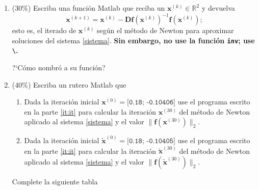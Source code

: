 \documentclass[letter,11pt]{article}
\newcommand{\matlab}{{\sc Matlab} }
\begin{document}
\begin{enumerate}
\begin{enumerate}
\item\label{it:it} (30\%) Escriba una funci\'on \matlab que reciba un $\boldsymbol{x}^{(k)} \in \mathbb{R}^2$ y devuelva
%
\begin{equation*}
\boldsymbol{x}^{(k+1)} = \boldsymbol{x}^{(k)} - \boldsymbol{D}\boldsymbol{f}(\boldsymbol{x}^{(k)})^{-1} \boldsymbol{f}(\boldsymbol{x}^{(k)});
\end{equation*}
%
esto es, el iterado de $\boldsymbol{x}^{(k)}$ seg\'un el m\'etodo de Newton para aproximar soluciones del sistema \eqref{sistema}.
\textbf{Sin embargo, no use la funci\'on \texttt{inv}; use \texttt{\textbackslash}.}

\medskip
\noindent ?`C\'omo nombr\'o a su funci\'on?\newline
{}

\bigskip

\item\label{it:initial_guesses} (40\%) Escriba un rutero \matlab que
\begin{enumerate}
\item Dada la iteraci\'on inicial $\boldsymbol{x}^{(0)} = \texttt{[0.18; -0.10406]}$ use el programa escrito en la parte \ref{it:it} para calcular la iteraci\'on $\boldsymbol{x}^{(30)}$ del m\'etodo de Newton aplicado al sistema \eqref{sistema} y el valor $\| \boldsymbol{f}(\boldsymbol{x}^{(30)}) \|_2$.
\item Dada la iteraci\'on inicial $\boldsymbol{\tilde x}^{(0)} = \texttt{[0.18; -0.10405]}$ use el programa escrito en la parte \ref{it:it} para calcular la iteraci\'on $\boldsymbol{\tilde x}^{(30)}$ del m\'etodo de Newton aplicado al sistema \eqref{sistema} y el valor $\| \boldsymbol{f}(\boldsymbol{\tilde x}^{(30)}) \|_2$.
\end{enumerate}
%

\medskip
\noindent Complete la siguiente tabla\newline
{}


\end{enumerate}
\end{enumerate}
\end{document}
